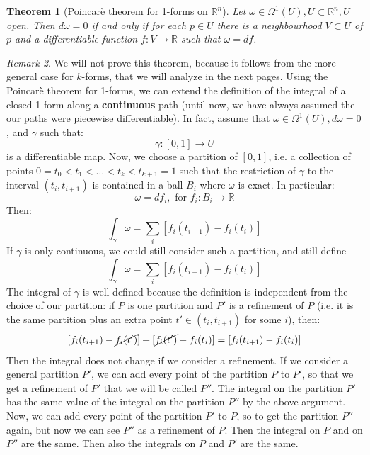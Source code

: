 \documentclass[a4paper,11pt,titlepage, article, oneside]{memoir}
\numberwithin{equation}{section}
\newtheorem{theorem}{Theorem}[section]
\theoremstyle{definition}
\theoremstyle{remark}
\newtheorem{remark}[theorem]{Remark}
\newcommand{\rfield}{\mathbb{R}}
\begin{document}
\begin{theorem}[Poincarè theorem for 1-forms on $\rfield^n$]
  Let $\omega \in \Omega^1(U), U \subset \rfield^n, U$ open. Then $d\omega = 0$ if and only if for each $p \in U$ there is a neighbourhood $V \subset U$ of $p$ and a differentiable function $f \colon V \rightarrow \rfield$ such that $\omega = df$.
\end{theorem}

\begin{remarkbox}\begin{remark}
  We will not prove this theorem, because it follows from the more general case for $k$-forms, that we will analyze in the next pages.
  Using the Poincarè theorem for 1-forms, we can extend the definition of the integral of a closed 1-form along a \textbf{continuous} path (until now, we have always assumed the our paths were piecewise differentiable). In fact, assume that $ \omega \in \Omega^1(U), d \omega = 0$, and $\gamma$ such that:
  $$\gamma \colon [0, 1] \rightarrow U$$ is a differentiable map.
  Now, we choose a partition of $[0, 1]$, i.e. a collection of points $0 = t_0 < t_1 < \ldots < t_k < t_{k+1} = 1$ such that the restriction of $\gamma$ to the interval $(t_i, t_{i+1})$ is contained in a ball $B_i$ where $\omega$ is exact. In particular:
  $$\omega = df_i, \text{ for } f_i \colon B_i \rightarrow \rfield$$
  Then:
  $$\int_{\gamma} \omega = \sum_i \left[ f_i(t_{i+1}) - f_i(t_i) \right ]$$
  If $\gamma$ is only continuous, we could still consider such a partition, and still define
  $$\int_{\gamma} \omega = \sum_i \left[ f_i(t_{i+1}) - f_i(t_i) \right ]$$
  The integral of $\gamma$ is well defined because the definition is independent from the choice of our partition: if $P$ is one partition and $P'$ is a refinement of $P$ (i.e. it is the same partition plus an extra point $t' \in (t_i, t_{i+1})$ for some $i$), then:
  $$[f_i(t_{i+1}) - \cancel{f_i(t')}] + [\cancel{f_i(t')} - f_i(t_i)] = [f_i(t_{i+1}) - f_i(t_i)]$$
  Then the integral does not change if we consider a refinement. If we consider a general partition $P'$, we can add every point of the partition $P$ to $P'$, so that we get a refinement of $P'$ that we will be called $P''$. The integral on the partition $P'$ has the same value of the integral on the partition $P''$ by the above argument. Now, we can add every point of the partition $P'$ to $P$, so to get the partition $P''$ again, but now we can see $P''$ as a refinement of $P$. Then the integral on $P$ and on $P''$ are the same. Then also the integrals on $P$ and $P'$ are the same.
\end{remark}\end{remarkbox}
\end{document}
